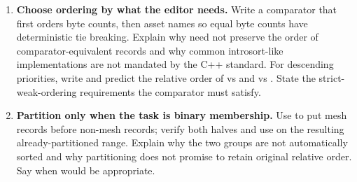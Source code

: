 \begin{enumerate}
  \textbf{Prove the traversal capabilities before selecting the algorithm.} Classify , , ,  and  according to input, forward, bidirectional, random-access and contiguous iterator concepts. Why can  operate on the vector's random-access iterators but not directly on  iterators? Why may binary search over forward iterators have logarithmic comparison count but linear iterator advances?
\item
  \textbf{Choose ordering by what the editor needs.} Write a comparator that first orders byte counts, then asset names so equal byte counts have deterministic tie breaking. Explain why  need not preserve the order of comparator-equivalent records and why common introsort-like implementations are not mandated by the C++ standard. For descending priorities, write  and predict the relative order of  vs  and  vs . State the strict-weak-ordering requirements the comparator must satisfy.
\item
  \textbf{Partition only when the task is binary membership.} Use  to put mesh records before non-mesh records; verify both halves and use  on the resulting already-partitioned range. Explain why the two groups are not automatically sorted and why partitioning does not promise to retain original relative order. Say when  would be appropriate.

\end{enumerate}
